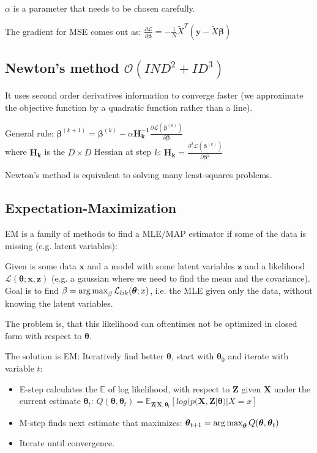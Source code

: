 \documentclass[10pt,a4paper,landscape]{article}
\renewcommand{\bf}[1]{\ensuremath{\mathbf{#1}}}
\newcommand{\bbeta}{\boldsymbol\beta}
\newcommand{\btheta}{\boldsymbol\theta}
\begin{document}
\begin{multicols*}{4}
$\alpha$ is a parameter that needs to be chosen carefully.

The gradient for MSE comes out as:
$\frac{\partial \mathcal{L}}{\partial \bbeta} = - \frac{1}{N} \tilde{X}^T ( \boldsymbol y - \tilde{X} \bbeta )$

\subsection{Newton's method \small$\mathcal{O}(I N D^2 + I D^3)$}
It uses second order derivatives information to converge faster (we approximate the objective function by a quadratic function rather than a line).

General rule: $\bbeta^{(k+1)} = \bbeta^{(k)} - \alpha \bf{H_k^{-1}} \frac{\partial \mathcal{L}(\bbeta^{(k)})}{\partial \bbeta}$\\
where $\bf{H_k}$ is the $D \times D$ Hessian at step $k$: $\bf{H_k} = \frac{\partial^2 \mathcal{L}(\bbeta^{(k)})}{\partial \bbeta^2}$

Newton's method is equivalent to solving many least-squares problems.


\subsection{Expectation-Maximization}
EM is a family of methods to find a MLE/MAP estimator if some of the data is missing (e.g. latent variables):

Given is some data $\bf{x}$ and  a model with some latent variables $\bf{z}$ and a likelihood $\mathcal{L}(\btheta; \bf{x}, \bf{z})$ (e.g. a gaussian where we need to find the mean and the covariance).
Goal is to find $\beta = \argmax_{\beta} \mathcal{L}_{lik}(\btheta; x)$, i.e. the MLE given only the data, without knowing the latent variables.

The problem is, that this likelihood can oftentimes not be optimized in closed form with respect to $\btheta$.

The solution is EM: Iteratively find better $\btheta$, start with $\btheta_0$ and iterate with variable $t$:
\begin{itemize}
\item E-step calculates the $\mathbb{E}$ of log likelihood, with respect to $\bf{Z}$ given $\bf{X}$ under the current estimate $\btheta_t$: $Q(\btheta, \btheta_t) = \mathbb{E}_{\bf{Z}|\bf{X},\btheta_t} [ log ( p(\bf{X}, \bf{Z} | \btheta) | X = x ]$
\item M-step finds next estimate that maximizes: $\btheta_{t+1} = \argmax_{\btheta} Q(\btheta, \btheta_t)$
\item Iterate until convergence.
\end{itemize}


\end{multicols*}
\end{document}
